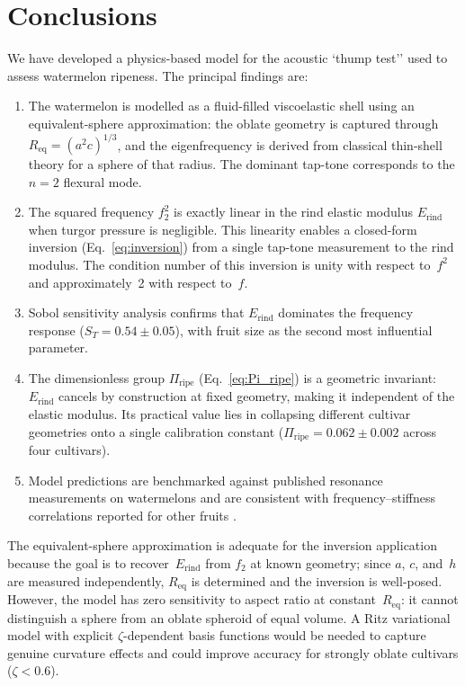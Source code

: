 \section{Conclusions}
\label{sec:conclusion}

We have developed a physics-based model for the acoustic `thump test''
used to assess watermelon ripeness.  The principal findings are:

\begin{enumerate}
  \item The watermelon is modelled as a fluid-filled viscoelastic shell
    using an equivalent-sphere approximation: the oblate geometry is
    captured through $R_{\mathrm{eq}} = (a^2 c)^{1/3}$, and the
    eigenfrequency is derived from classical thin-shell theory for a
    sphere of that radius.  The dominant tap-tone corresponds to the
    $n = 2$ flexural mode.

  \item The squared frequency $f_2^2$ is exactly linear in the rind
    elastic modulus $E_{\mathrm{rind}}$ when turgor pressure is
    negligible.  This linearity enables a closed-form inversion
    (Eq.~\ref{eq:inversion}) from a single tap-tone measurement to the
    rind modulus.  The condition number of this inversion is unity with
    respect to~$f^2$ and approximately~2 with respect to~$f$.

  \item Sobol sensitivity analysis confirms that
    $E_{\mathrm{rind}}$ dominates the frequency response
    ($S_T = 0.54 \pm 0.05$), with fruit size as the second most influential
    parameter.

  \item The dimensionless group $\Pi_{\mathrm{ripe}}$
    (Eq.~\ref{eq:Pi_ripe}) is a geometric invariant: $E_{\mathrm{rind}}$
    cancels by construction at fixed geometry, making it independent of
    the elastic modulus.
    Its practical value lies in collapsing different cultivar geometries
    onto a single calibration constant
    ($\Pi_{\mathrm{ripe}} = 0.062 \pm 0.002$ across four cultivars).

  \item Model predictions are benchmarked against published resonance
    measurements on watermelons \cite{Yamamoto1980} and are consistent
    with frequency--stiffness correlations reported for other fruits
    \cite{DeBelieetal2000, ChenDeBaerdemaeker1993}.
\end{enumerate}

The equivalent-sphere approximation is adequate for the inversion
application because the goal is to recover~$E_{\mathrm{rind}}$ from
$f_2$ at known geometry; since $a$, $c$, and~$h$ are measured
independently, $R_{\mathrm{eq}}$ is determined and the inversion is
well-posed.  However, the model has zero sensitivity to aspect ratio at
constant~$R_{\mathrm{eq}}$: it cannot distinguish a sphere from an
oblate spheroid of equal volume.  A Ritz variational model with explicit
$\zeta$-dependent basis functions would be needed to capture genuine
curvature effects and could improve accuracy for strongly oblate
cultivars ($\zeta < 0.6$).

